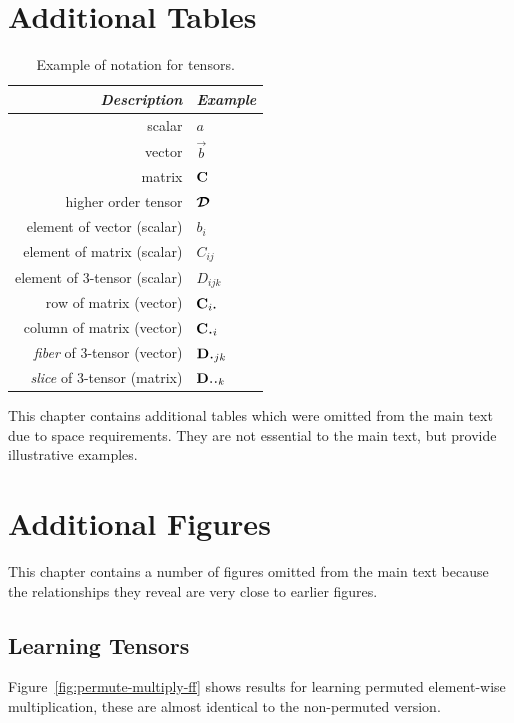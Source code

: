 \chapter{Additional Tables}
\begin{table}
\centering
\begin{tabu} to 0.5\linewidth {|r|l|}
\hline 
\textit{Description} & \textit{Example} \\
\hline
scalar & \(a\) \\
vector & \(\vec{b}\) \\
matrix & \(\mathbf{C}\) \\
higher order tensor & \(\bm{\mathcal{D}}\) \\
element of vector (scalar) & \(b_i\) \\
element of matrix (scalar) & \(C_{ij}\) \\
element of 3-tensor (scalar) & \(D_{ijk}\) \\
row of matrix (vector) & \(\vec{C}_{i\midbullet}\) \\
column of matrix (vector) & \(\vec{C}_{\midbullet i}\)\\
\textit{fiber} of 3-tensor (vector) & \(\vec{D}_{\midbullet jk}\)\\
\textit{slice} of 3-tensor (matrix) & \(\mat{D}_{\midbullet\midbullet k}\)\\
\hline
\end{tabu}
\caption{Example of notation for tensors.}
\label{tab:notation}
\end{table}

This chapter contains additional tables which were omitted from the main text due to space
requirements. They are not essential to the main text, but provide illustrative examples.

\chapter{Additional Figures}
This chapter contains a number of figures omitted from the main text because the relationships
they reveal are very close to earlier figures.

\section{Learning Tensors}
Figure~\ref{fig:permute-multiply-ff} shows results for learning permuted element-wise multiplication,
these are almost identical to the non-permuted version.



